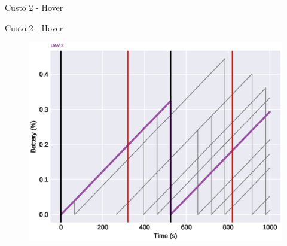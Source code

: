\begin{frame}{Custo 2 - Hover}
\begin{figure}[!htb]
                 \end{figure}
            \end{frame}\begin{frame}{Custo 2 - Hover}
                \begin{figure}[!htb]
                     \includegraphics[width=\textwidth]{custo_2/uav_hover_acum_uav_3.eps}
                 \end{figure}
            \end{frame}